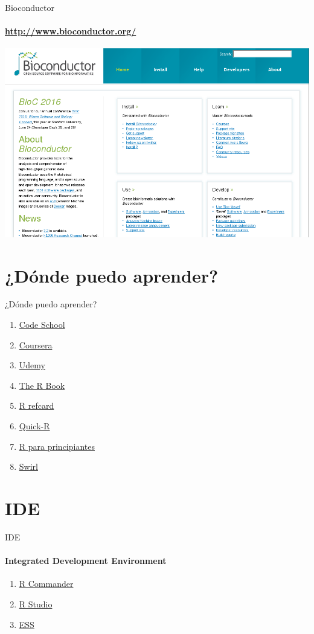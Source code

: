 \documentclass[12pt]{beamer}
\begin{document}
\begin{frame}{Bioconductor}
\framesubtitle{\url{http://www.bioconductor.org/}}
\begin{center}
\href{http://www.bioconductor.org/}{\includegraphics[scale=0.35]{images/image4}}
\end{center}
\end{frame}
\section{¿Dónde puedo aprender?}
\begin{frame}{¿Dónde puedo aprender?}
\begin{enumerate}[<+->]
\item \href{https://www.codeschool.com/courses/try-r}{Code School}
\item \href{https://www.coursera.org/courses?languages=en&query=r}{Coursera}
\item \href{https://www.udemy.com/courses/search/?ref=home&src=ukw&q=R&lang=en}{Udemy}
\item \href{https://archive.org/details/TheRBook}{The R Book}
\item \href{https://cran.r-project.org/doc/contrib/Short-refcard.pdf}{R refcard}
\item \href{http://www.statmethods.net/}{Quick-R}
\item \href{https://cran.r-project.org/doc/contrib/rdebuts_es.pdf}{R para principiantes}
\item \href{http://swirlstats.com/}{Swirl}
\end{enumerate}    
\end{frame}

\section{IDE}
\begin{frame}{IDE}
\framesubtitle{Integrated Development Environment
}
\begin{enumerate}[<+->]
\item \href{http://www.rcommander.com/}{R Commander}
\item \href{https://www.rstudio.com/}{R Studio}
\item \href{http://ess.r-project.org/}{ESS}
\end{enumerate}
\end{frame}
\end{document}
